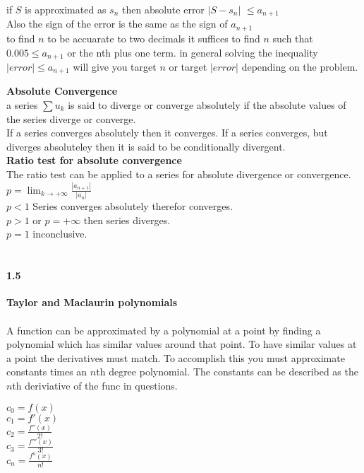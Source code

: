 \documentclass[14pt]{extreport}
\begin{document}
if $S$ is approximated as $s_n$ then absolute error $|S-s_n|$ $\le a_{n+1}$\\
Also the sign of the error is the same as the sign of $a_{n+1}$\\

to find $n$ to be accuarate to two decimals it suffices to find $n$ such that $0.005 \le a_{n+1}$ or the nth plus one term. in general solving the inequality $|error| \le a_{n+1}$ will give you target $n$ or target $|error|$ depending on the problem.

\textbf{Absolute Convergence}\\
a series $\sum u_k$ is said to diverge or converge absolutely if the absolute values of the series diverge or converge.\\ 

If a series converges absolutely then it converges. If a series converges, but diverges absoluteley then it is said to be conditionally divergent.\\

\textbf{Ratio test for absolute convergence}\\
The ratio test can be applied to a series for absolute divergence or convergence.\\
$ p = \lim_{k \to +\infty} \frac{|a_{n+1}|}{|a_n|}$\\
$ p < 1$ Series converges absolutely therefor converges.\\
$ p > 1$ or $p= +\infty$ then series diverges.\\
$ p = 1$ inconclusive.\\\\


\paragraph{1.5}\textbf{Taylor and Maclaurin polynomials}\\\\
A function can be approximated by a polynomial at a point by finding a polynomial which has similar values around that point. To have similar values at a point the derivatives must match. To accomplish this you must approximate constants times an $n$th degree polynomial. The constants can be described as the $n$th deriviative of the func in questions.

$c_0 = f(x)$\\
$c_1 = f'(x)$\\
$c_2 = \frac{f''(x)}{2!}$\\
$c_3 = \frac{f'''(x)}{3!}$\\
$c_n = \frac{f^n(x)}{n!}$\\
\end{document}
